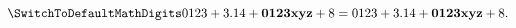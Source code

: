 \documentclass{article}
\begin{document}
\[{\SwitchToDefaultMathDigits 
0123+3.14+\mathbf{0123xyz}+8}
  =0123+3.14+\mathbf{0123xyz}+8.\]
\end{document}
